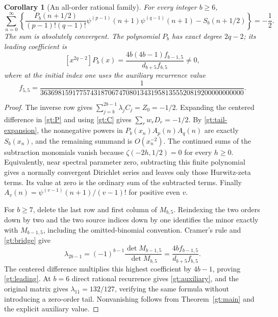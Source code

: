 \documentclass[11pt,a4paper]{article}
\newtheorem{corollary}[theorem]{Corollary}
\theoremstyle{definition}
\theoremstyle{remark}
\numberwithin{equation}{section}
\begin{document}
\begin{corollary}[An all-order rational family]
\label{gt:ordinary}
For every integer $b\ge6$,
\begin{equation}\label{gt:ordinary-sum}
 \boxed{\displaystyle
 \sum_{n=0}^{\infty}\left\{
 \frac{P_b(n+1/2)}{(p-1)!(q-1)!}
   \psi^{(p-1)}(n+1)\psi^{(q-1)}(n+1)-S_b(n+1/2)
                         \right\}=-\frac12.}
\end{equation}
The sum is absolutely convergent. The polynomial $P_b$ has exact
degree $2q-2$; its leading coefficient is
\begin{equation}\label{gt:leading}
 [x^{2q-2}]P_b(x)=
       \frac{4b(4b-1)f_{b-1,5}}{d_{b+5}f_{b,5}}\ne0,
\end{equation}
where at the initial index one uses the auxiliary recurrence value
\begin{equation}\label{gt:auxiliary}
 f_{5,5}=
 \frac1{363698159177574318706747080134319581355520819200000000000}.
\end{equation}
\end{corollary}

\begin{proof}
The inverse row gives $\sum_{j=b}^{2b-1}\lambda_jC_j=Z_0=-1/2$.
Expanding the centered difference in \eqref{gt:P} and using
\eqref{gt:C} gives $\sum_rw_rD_r=-1/2$.
By \eqref{gt:tail-expansion}, the nonnegative powers in
$P_b(x_n)A_p(n)A_q(n)$ are exactly $S_b(x_n)$, and the remaining
summand is $O(x_n^{-2})$. The continued sums of the subtraction
monomials vanish because $\zeta(-2h,1/2)=0$ for every $h\ge0$.
Equivalently, near spectral parameter zero, subtracting this finite
polynomial gives a normally convergent Dirichlet series and leaves
only those Hurwitz-zeta terms. Its value at zero is the ordinary
sum of the subtracted terms. Finally
$A_v(n)=\psi^{(v-1)}(n+1)/(v-1)!$ for positive even $v$.

For $b\ge7$, delete the last row and first column of $M_{b,5}$.
Reindexing the two orders down by two and the two source indices
down by one identifies the minor exactly with $M_{b-1,5}$,
including the omitted-binomial convention. Cramer's rule and
\eqref{gt:bridge} give
\[
 \lambda_{2b-1}=(-1)^{b-1}\frac{\det M_{b-1,5}}{\det M_{b,5}}
               =\frac{4b f_{b-1,5}}{d_{b+5}f_{b,5}}.
\]
The centered difference multiplies this highest coefficient by
$4b-1$, proving \eqref{gt:leading}. At $b=6$ direct rational
recurrence gives \eqref{gt:auxiliary}, and the original matrix
gives $\lambda_{11}=132/127$, verifying the same formula without
introducing a zero-order tail. Nonvanishing follows from
Theorem~\ref{gt:main} and the explicit auxiliary value.
\end{proof}
\end{document}

